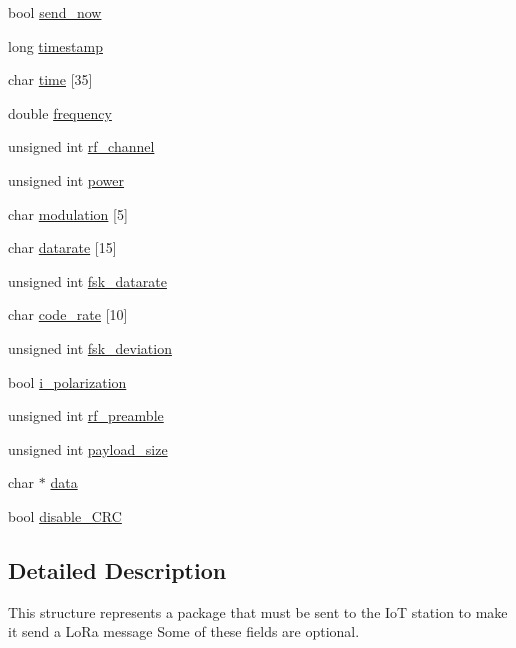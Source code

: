 \begin{DoxyCompactItemize}
\item 
bool \hyperlink{structdownstream__packet_a2233496db347682f0b4005fe07310c58}{send\-\_\-now}
\item 
long \hyperlink{structdownstream__packet_ac5deed89768140dbc80dbc6529a5e14a}{timestamp}
\item 
char \hyperlink{structdownstream__packet_a7ba42be95635137cb867f08c8aa01f3b}{time} \mbox{[}35\mbox{]}
\item 
double \hyperlink{structdownstream__packet_a4c45cdff103e6644a620ba5061509f22}{frequency}
\item 
unsigned int \hyperlink{structdownstream__packet_a566a9646361d592aa0be3fe468b29aad}{rf\-\_\-channel}
\item 
unsigned int \hyperlink{structdownstream__packet_a59104ad6aeccc2a5011202486a11959f}{power}
\item 
char \hyperlink{structdownstream__packet_a167264916b5fad13dd3dc470128e3eef}{modulation} \mbox{[}5\mbox{]}
\item 
char \hyperlink{structdownstream__packet_a96f84d084cdf0e910c2482be0632fa97}{datarate} \mbox{[}15\mbox{]}
\item 
unsigned int \hyperlink{structdownstream__packet_ae4bd55e8e15052cb4ac21a9aba5866ad}{fsk\-\_\-datarate}
\item 
char \hyperlink{structdownstream__packet_a9bb17e8dc14670aedcd5b69e797d19d7}{code\-\_\-rate} \mbox{[}10\mbox{]}
\item 
unsigned int \hyperlink{structdownstream__packet_a3f5d6010dd5bdc3cedcb44caece43a59}{fsk\-\_\-deviation}
\item 
bool \hyperlink{structdownstream__packet_a17de42e009f605885975928f7dad2d0c}{i\-\_\-polarization}
\item 
unsigned int \hyperlink{structdownstream__packet_a4f552d54b9b164e0e8677ba5e591c84c}{rf\-\_\-preamble}
\item 
unsigned int \hyperlink{structdownstream__packet_a75b5ec600c45b3430f28b8bcf16d868a}{payload\-\_\-size}
\item 
char $\ast$ \hyperlink{structdownstream__packet_a91a70b77df95bd8b0830b49a094c2acb}{data}
\item 
bool \hyperlink{structdownstream__packet_af235dcb1657075c3d7f13390ee408eea}{disable\-\_\-\-C\-R\-C}
\end{DoxyCompactItemize}


\subsection{Detailed Description}
This structure represents a package that must be sent to the Io\-T station to make it send a Lo\-Ra message Some of these fields are optional. 

